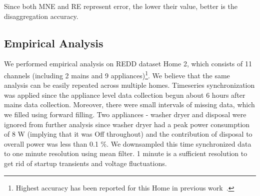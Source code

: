 \documentclass[conference]{IEEEtran}
\begin{document}
\noindent Since both MNE and RE represent error, the lower their value, better is the disaggregation accuracy. 




\vspace{-3mm}
\subsection{Empirical Analysis}
\vspace{-1mm}
\noindent We performed empirical analysis on REDD dataset Home 2, which consists of 11 channels (including 2 mains and 9 appliances)\footnote{Highest accuracy has been reported for this Home in previous work~\cite{redd}.}. We believe that the same analysis can be easily repeated across multiple homes. Timeseries synchronization was applied since the appliance level data collection begun about 6 hours after mains data collection. Moreover, there were small intervals of missing data, which we filled using forward filling. Two appliances - washer dryer and disposal were ignored from further analysis since washer dryer had a peak power consumption of 8 W (implying that it was Off throughout) and the contribution of disposal to overall power was less than 0.1 \%.  We downsampled this time synchronized data to one minute resolution using mean filter. 1 minute is a sufficient resolution to get rid of startup transients and voltage fluctuations. 
\end{document}
